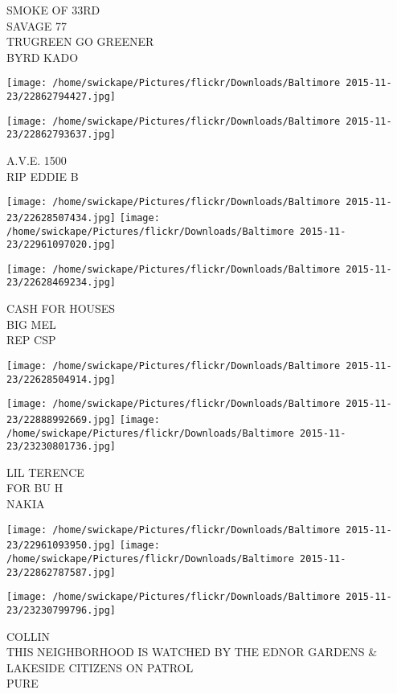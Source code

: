 \documentclass[10pt,letterpaper]{article}
\begin{document}
SMOKE OF 33RD\\
SAVAGE 77\\
TRUGREEN GO GREENER\\
BYRD KADO\\
\pagebreak

\texttt{[image: /home/swickape/Pictures/flickr/Downloads/Baltimore 2015-11-23/22862794427.jpg]}

\vspace{0.25in}
\texttt{[image: /home/swickape/Pictures/flickr/Downloads/Baltimore 2015-11-23/22862793637.jpg]}

A.V.E. 1500\\
RIP EDDIE B\\
\pagebreak

\texttt{[image: /home/swickape/Pictures/flickr/Downloads/Baltimore 2015-11-23/22628507434.jpg]}
\texttt{[image: /home/swickape/Pictures/flickr/Downloads/Baltimore 2015-11-23/22961097020.jpg]}

\texttt{[image: /home/swickape/Pictures/flickr/Downloads/Baltimore 2015-11-23/22628469234.jpg]}

CASH FOR HOUSES\\
BIG MEL\\
REP CSP\\
\pagebreak

\texttt{[image: /home/swickape/Pictures/flickr/Downloads/Baltimore 2015-11-23/22628504914.jpg]}

\vspace{0.25in}
\texttt{[image: /home/swickape/Pictures/flickr/Downloads/Baltimore 2015-11-23/22888992669.jpg]}
\texttt{[image: /home/swickape/Pictures/flickr/Downloads/Baltimore 2015-11-23/23230801736.jpg]}

LIL TERENCE\\
FOR BU H\\
NAKIA\\
\pagebreak

\texttt{[image: /home/swickape/Pictures/flickr/Downloads/Baltimore 2015-11-23/22961093950.jpg]}
\texttt{[image: /home/swickape/Pictures/flickr/Downloads/Baltimore 2015-11-23/22862787587.jpg]}

\vspace{0.25in}
\texttt{[image: /home/swickape/Pictures/flickr/Downloads/Baltimore 2015-11-23/23230799796.jpg]}

COLLIN\\
THIS NEIGHBORHOOD IS WATCHED BY THE EDNOR GARDENS \& LAKESIDE CITIZENS ON PATROL\\
PURE\\
\pagebreak
\end{document}
